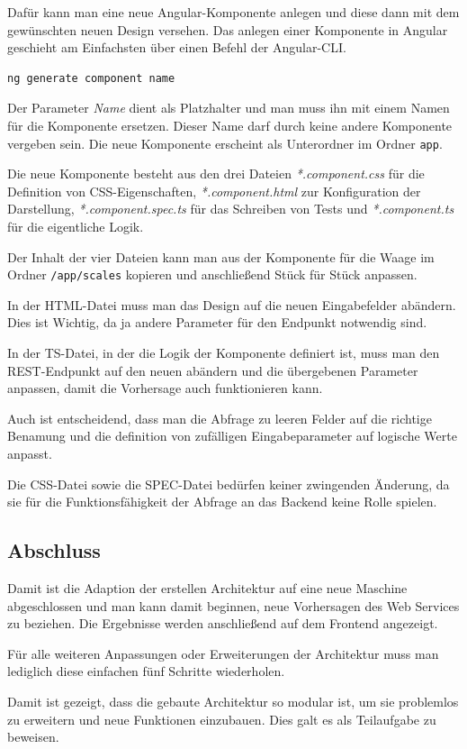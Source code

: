 Dafür kann man eine neue Angular-Komponente anlegen und diese dann mit dem gewünschten neuen Design versehen. Das
anlegen einer Komponente in Angular geschieht am Einfachsten über einen Befehl der Angular-CLI.

\begin{lstlisting}[caption=Erstellen einer neuen Komponente, label=ls:schlauchbeutelmaschine_component]
    ng generate component name
\end{lstlisting}

Der Parameter \textit{Name} dient als Platzhalter und man muss ihn mit einem Namen für die Komponente ersetzen. Dieser
Name darf durch keine andere Komponente vergeben sein. Die neue Komponente erscheint als Unterordner im Ordner
\texttt{app}.

Die neue Komponente besteht aus den drei Dateien \textit{*.component.css} für die Definition von CSS-Eigenschaften,
\textit{*.component.html} zur Konfiguration der Darstellung, \textit{*.component.spec.ts} für das Schreiben von Tests
und \textit{*.component.ts} für die eigentliche Logik.

Der Inhalt der vier Dateien kann man aus der Komponente für die Waage im Ordner \texttt{/app/scales} kopieren und
anschließend Stück für Stück anpassen.

In der HTML-Datei muss man das Design auf die neuen Eingabefelder abändern. Dies ist Wichtig, da ja andere Parameter für
den Endpunkt notwendig sind.

In der TS-Datei, in der die Logik der Komponente definiert ist, muss man den REST-Endpunkt auf den neuen abändern und
die übergebenen Parameter anpassen, damit die Vorhersage auch funktionieren kann.

Auch ist entscheidend, dass man die Abfrage zu leeren Felder auf die richtige Benamung und die definition von
zufälligen Eingabeparameter auf logische Werte anpasst.

Die CSS-Datei sowie die SPEC-Datei bedürfen keiner zwingenden Änderung, da sie für die Funktionsfähigkeit der Abfrage an
das Backend keine Rolle spielen.

\subsection{Abschluss}
Damit ist die Adaption der erstellen Architektur auf eine neue Maschine abgeschlossen und man kann damit beginnen,
neue Vorhersagen des Web Services zu beziehen. Die Ergebnisse werden anschließend auf dem Frontend angezeigt.

Für alle weiteren Anpassungen oder Erweiterungen der Architektur muss man lediglich diese einfachen fünf Schritte
wiederholen.

Damit ist gezeigt, dass die gebaute Architektur so modular ist, um sie problemlos zu erweitern und neue Funktionen
einzubauen. Dies galt es als Teilaufgabe zu beweisen.
